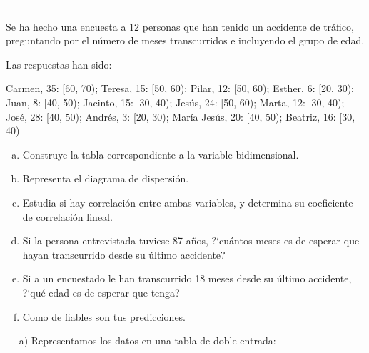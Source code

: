 \begin{ejemplo}
\begin{ejer}\textcolor{white}{.}

Se ha hecho una encuesta a 12 personas que han tenido un accidente de tráfico, preguntando por el número de meses transcurridos e incluyendo el grupo de edad. 

Las respuestas han sido: 

Carmen, 35: [60, 70);  Teresa, 15: [50, 60);  Pilar, 12: [50, 60);  Esther, 6: [20, 30); Juan, 8: [40, 50); Jacinto, 15: [30, 40); Jesús, 24: [50, 60); Marta, 12: [30, 40); José, 28: [40, 50); Andrés, 3: [20, 30); María Jesús, 20: [40, 50); Beatriz, 16: [30, 40) 

\begin{adjustwidth}{20pt}{10pt}
\begin{enumerate}[a) ]
\item Construye la tabla correspondiente a la variable bidimensional.
\item  Representa el diagrama de dispersión. 
\item Estudia si hay correlación entre ambas variables, y determina su coeficiente de correlación lineal.	
\item Si la persona entrevistada tuviese 87 años, ?`cuántos meses es de esperar que hayan transcurrido desde su último accidente?
\item Si a un encuestado le han transcurrido 18 meses desde su último accidente, ?`qué edad es de esperar que tenga?
\item Como de fiables son tus predicciones.
\end{enumerate}
\end{adjustwidth}
\end{ejer}
\end{ejemplo}

--- a) Representamos los datos en una tabla de doble entrada:

